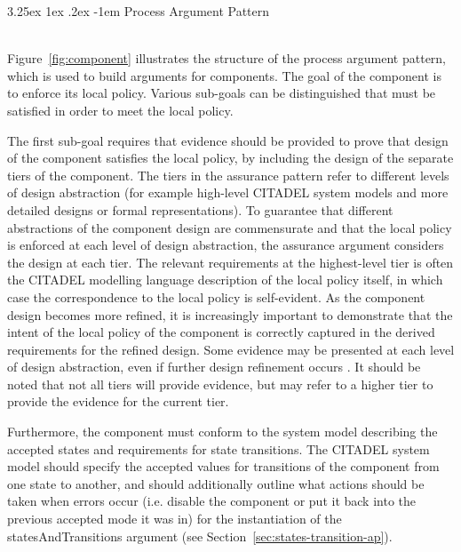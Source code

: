 \documentclass[12pt,twoside,a4paper]{article}
\makeatletter
\renewcommand\paragraph{\@startsection{paragraph}{5}{\z@}%
  {3.25ex \@plus1ex \@minus.2ex}%
  {-1em}%
  {\normalfont\normalsize\bfseries}}
\makeatother
\begin{document}
\clearpage
\paragraph{Process Argument Pattern} \label{sssec:process-ap}

~\\
Figure~\ref{fig:component} illustrates the structure of the process argument pattern, which is used to build arguments for components. The goal of the component is to enforce its local policy. Various sub-goals can be distinguished that must be satisfied in order to meet the local policy. 

The first sub-goal requires that evidence should be provided to prove that design of the component satisfies the local policy, by including the design of the separate tiers of the component. The tiers in the assurance pattern refer to different levels of design abstraction (for example high-level CITADEL system models and more detailed designs or formal representations). To guarantee that different abstractions of the component design are commensurate and that the local policy is enforced at each level of design abstraction, the assurance argument considers the design at each tier. The relevant requirements at the highest-level tier is often the CITADEL modelling language description of the local policy itself, in which case the correspondence to the local policy is self-evident. As the component design becomes more refined, it is increasingly important to demonstrate that the intent of the local policy of the component is correctly captured in the derived requirements for the refined design. Some evidence may be presented at each level of design abstraction, even if further design refinement occurs \cite{D-MILS-D2.4}. It should be noted that not all tiers will provide evidence, but may refer to a higher tier to provide the evidence for the current tier.

Furthermore, the component must conform to the system model describing the accepted states and requirements for state transitions. The CITADEL system model should specify the accepted values for transitions of the component from one state to another, and should additionally outline what actions should be taken when errors occur (i.e. disable the component or put it back into the previous accepted mode it was in) for the instantiation of the statesAndTransitions argument (see Section~\ref{sec:states-transition-ap}).
\end{document}
